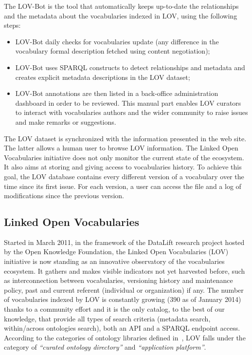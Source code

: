 The LOV-Bot is the tool that automatically keeps up-to-date the relationships and the metadata about the vocabularies indexed in LOV, using the following steps:
\begin{itemize}
  \item	LOV-Bot daily checks for vocabularies update (any difference in the vocabulary formal description fetched using content negotiation);
  \item	LOV-Bot uses SPARQL constructs to detect relationships and metadata and creates explicit metadata descriptions in the LOV dataset;
  \item	LOV-Bot annotations are then listed in a back-office administration dashboard in order to be reviewed. This manual part enables LOV curators to interact with vocabularies authors and the wider community to raise issues and make remarks or suggestions.
\end{itemize}
The LOV dataset is synchronized with the information presented in the web site. The latter allows a human user to browse LOV information.  The Linked Open Vocabularies initiative does not only monitor the current state of the ecosystem. It also aims at storing and giving access to vocabularies history. To achieve this goal, the LOV database contains every different version of a vocabulary over the time since its first issue. For each version, a user can access the file and a log of modifications since the previous version.

\subsection{Linked Open Vocabularies}     \label{sec:lov}

Started in March 2011, in the framework of the DataLift research project \cite{scharffe_2012} hosted by the Open Knowledge Foundation, the Linked Open Vocabularies (LOV) initiative is now standing as an innovative observatory of the vocabularies ecosystem. It gathers and makes visible indicators not yet harvested before, such as interconnection between vocabularies, versioning history and maintenance policy, past and current referent (individual or organization) if any. The number of vocabularies indexed by LOV is constantly growing (390 as of January 2014) thanks to a community effort and it is the only catalog, to the best of our knowledge, that provide all types of search criteria (metadata search, within/across ontologies search), both an API and a SPARQL endpoint access. According to the categories of ontology libraries defined in~\cite{AquinJoWS12}, LOV falls under the category of \textit{``curated ontology directory''}  and \textit{``application platform''}. 

